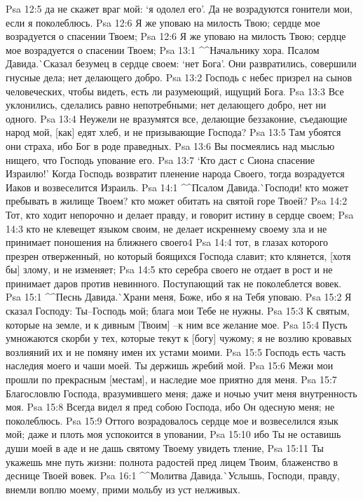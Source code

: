 Psa 12:5  да не скажет враг мой: `я одолел его'. Да не возрадуются гонители мои, если я поколеблюсь.
Psa 12:6  Я же уповаю на милость Твою; сердце мое возрадуется о спасении Твоем;
Psa 12:6  Я же уповаю на милость Твою; сердце мое возрадуется о спасении Твоем;
Psa 13:1  ^^Начальнику хора. Псалом Давида.^^ Сказал безумец в сердце своем: `нет Бога'. Они развратились, совершили гнусные дела; нет делающего добро.
Psa 13:2  Господь с небес призрел на сынов человеческих, чтобы видеть, есть ли разумеющий, ищущий Бога.
Psa 13:3  Все уклонились, сделались равно непотребными; нет делающего добро, нет ни одного.
Psa 13:4  Неужели не вразумятся все, делающие беззаконие, съедающие народ мой, [как] едят хлеб, и не призывающие Господа?
Psa 13:5  Там убоятся они страха, ибо Бог в роде праведных.
Psa 13:6  Вы посмеялись над мыслью нищего, что Господь упование его.
Psa 13:7  `Кто даст с Сиона спасение Израилю!' Когда Господь возвратит пленение народа Своего, тогда возрадуется Иаков и возвеселится Израиль.
Psa 14:1  ^^Псалом Давида.^^ Господи! кто может пребывать в жилище Твоем? кто может обитать на святой горе Твоей?
Psa 14:2  Тот, кто ходит непорочно и делает правду, и говорит истину в сердце своем;
Psa 14:3  кто не клевещет языком своим, не делает искреннему своему зла и не принимает поношения на ближнего своего4
Psa 14:4  тот, в глазах которого презрен отверженный, но который боящихся Господа славит; кто клянется, [хотя бы] злому, и не изменяет;
Psa 14:5  кто серебра своего не отдает в рост и не принимает даров против невинного. Поступающий так не поколеблется вовек.
Psa 15:1  ^^Песнь Давида.^^ Храни меня, Боже, ибо я на Тебя уповаю.
Psa 15:2  Я сказал Господу: Ты--Господь мой; блага мои Тебе не нужны.
Psa 15:3  К святым, которые на земле, и к дивным [Твоим] --к ним все желание мое.
Psa 15:4  Пусть умножаются скорби у тех, которые текут к [богу] чужому; я не возлию кровавых возлияний их и не помяну имен их устами моими.
Psa 15:5  Господь есть часть наследия моего и чаши моей. Ты держишь жребий мой.
Psa 15:6  Межи мои прошли по прекрасным [местам], и наследие мое приятно для меня.
Psa 15:7  Благословлю Господа, вразумившего меня; даже и ночью учит меня внутренность моя.
Psa 15:8  Всегда видел я пред собою Господа, ибо Он одесную меня; не поколеблюсь.
Psa 15:9  Оттого возрадовалось сердце мое и возвеселился язык мой; даже и плоть моя успокоится в уповании,
Psa 15:10  ибо Ты не оставишь души моей в аде и не дашь святому Твоему увидеть тление,
Psa 15:11  Ты укажешь мне путь жизни: полнота радостей пред лицем Твоим, блаженство в деснице Твоей вовек.
Psa 16:1  ^^Молитва Давида.^^ Услышь, Господи, правду, внемли воплю моему, прими мольбу из уст нелживых.
